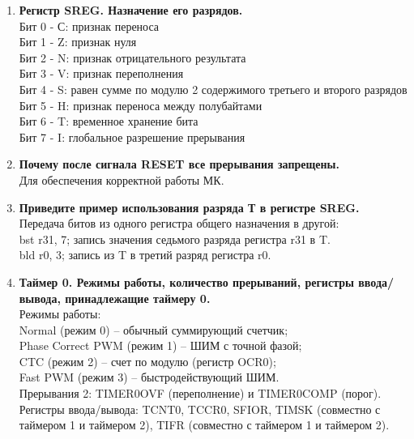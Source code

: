 \documentclass[a4paper, 12pt, twoside]{article}
\begin{document}
\begin{enumerate}
		PORTA – регистр данных порта А\\
		DDRA – регистр выбора направления передачи данных порта А\\
		PINA – нельзя ничего записать, при чтении из него будет прочитано то, что в данный момент присутствует на выводах порта А\\
		Прерываний у порта А нет.
	\item \textbf{Регистр SREG. Назначение его разрядов.}\\
		Бит 0 - С: признак переноса\\
		Бит 1 - Z: признак нуля\\
		Бит 2 - N: признак отрицательного результата\\
		Бит 3 - V: признак переполнения\\
		Бит 4 - S: равен сумме по модулю 2 содержимого третьего и второго разрядов\\
		Бит 5 - H: признак переноса между полубайтами\\
		Бит 6 - T: временное хранение бита\\
		Бит 7 - I: глобальное разрешение прерывания
	\item \textbf{Почему после сигнала RESET все прерывания запрещены.}\\
		Для обеспечения корректной работы МК.
	\item \textbf{Приведите пример использования разряда Т в регистре SREG.}\\
		Передача битов из одного регистра общего назначения в другой: \\
		bst r31, 7; запись значения седьмого разряда регистра r31 в T.\\
		bld r0, 3; запись из T в третий разряд регистра r0.
	\item \textbf{Таймер 0. Режимы работы, количество прерываний, регистры ввода/вывода,
принадлежащие таймеру 0.}\\
		Режимы работы:\\
		Normal (режим 0) – обычный суммирующий счетчик;\\
		Phase Correct PWM (режим 1) – ШИМ с точной фазой;\\
		CTC (режим 2) – счет по модулю (регистр OCR0);\\
		Fast PWM (режим 3) – быстродействующий ШИМ.\\
		Прерывания 2: TIMER0OVF (переполнение) и TIMER0COMP (порог).\\
		Регистры ввода/вывода: TCNT0, TCCR0, SFIOR, TIMSK (совместно с таймером 1
		и таймером 2), TIFR (совместно с таймером 1 и таймером 2).

\end{enumerate}
\end{document}
